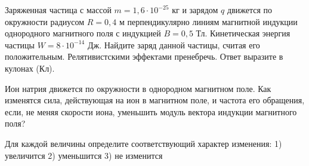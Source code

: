 \begin{taskbasic}[code={\label{task:elem_mag_particle_charge_energy}}]
Заряженная частица с массой $m = 1{,}6 \cdot 10^{-25}\text{ кг}$ и зарядом $q$ движется по окружности радиусом $R = 0{,}4\text{ м}$ перпендикулярно линиям магнитной индукции однородного магнитного поля с индукцией $B = 0{,}5\text{ Тл}$. Кинетическая энергия частицы $W = 8 \cdot 10^{-14}\text{ Дж}$. Найдите заряд данной частицы, считая его положительным. Релятивистскими эффектами пренебречь. Ответ выразите в кулонах (Кл).

\end{taskbasic}

\begin{taskbasic}[code={\label{task:elem_mag_ion_field_reduction}}]
Ион натрия движется по окружности в однородном магнитном поле. Как изменятся сила, действующая на ион в магнитном поле, и частота его обращения, если, не меняя скорости иона, уменьшить модуль вектора индукции магнитного поля?

Для каждой величины определите соответствующий характер изменения:
1) увеличится
2) уменьшится
3) не изменится

\end{taskbasic}

